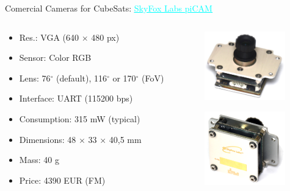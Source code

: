 \begin{frame}{Comercial Cameras for CubeSats: \href{https://www.skyfoxlabs.com/product/27-digital-cubesat-camera}{\textcolor{cyan}{\underline{SkyFox Labs piCAM}}}}
    \begin{columns}[t]
        \begin{column}[t]{0.65\textwidth}
            \begin{itemize}
                \item Res.: VGA (640 $\times$ 480 px)
                \item Sensor: Color RGB
                \item Lens: 76$^{\circ}$ (default), 116$^{\circ}$ or 170$^{\circ}$ (FoV)
                \item Interface: UART (115200 bps) 
                \item Consumption: 315 mW (typical)
                \item Dimensions: 48 $\times$ 33 $\times$ 40,5 mm
                \item Mass: 40 g
                \item Price: 4390 EUR (FM)
            \end{itemize}
        \end{column}
        \begin{column}[t]{0.35\textwidth}
            \begin{figure}[!ht]
                \begin{center}
                    \includegraphics[width=3.5cm]{figures/picam-front}
                \end{center}
            \end{figure}
            \begin{figure}[!ht]
                \begin{center}
                    \includegraphics[width=3.5cm]{figures/picam-back}
                \end{center}
            \end{figure}
        \end{column}
    \end{columns}
    
\end{frame}

